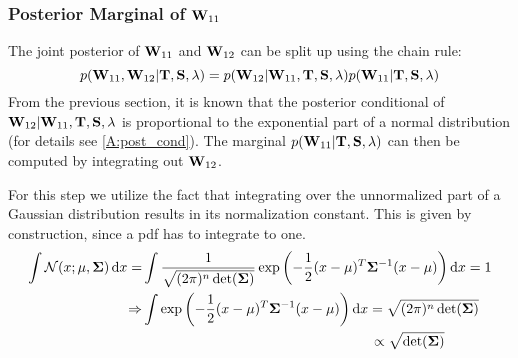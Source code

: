 \subsubsection{Posterior Marginal of $\mathbf{W}_{11}$}
\label{ss:postmarginal}
The joint posterior of $\mathbf{W}_{11}$ and $\mathbf{W}_{12}$ can be split up using the chain rule:
$$ p(\mathbf{W}_{11}, \mathbf{W}_{12} | \mathbf{T}, \mathbf{S}, \lambda) = 
p(\mathbf{W}_{12} | \mathbf{W}_{11}, \mathbf{T}, \mathbf{S}, \lambda) p(\mathbf{W}_{11} | \mathbf{T}, \mathbf{S}, \lambda)
$$
From the previous section, it is known that the posterior conditional of $\mathbf{W}_{12} | \mathbf{W}_{11}, \mathbf{T}, \mathbf{S}, \lambda$
is proportional to the exponential part of a normal distribution (for details see \autoref{A:post_cond}).
The marginal $p(\mathbf{W}_{11} |  \mathbf{T}, \mathbf{S}, \lambda)$ can then be computed by integrating out $\mathbf{W}_{12}$.

For this step we utilize the fact that integrating over the unnormalized part of a Gaussian distribution results in its normalization constant. This is given by construction, since a \gls{pdf} has to integrate to one.
\begin{align*}
\int \mathcal{N}(x;\mu, \matr{\Sigma})\dif x=
&\int \frac{1}{\sqrt{(2\pi)^n\det(\boldsymbol\Sigma)}}
\exp\left(
-\frac{1}{2}({x}-{\mu})^T{\boldsymbol\Sigma}^{-1}({x}-{\mu})
\right)
\dif x
= 1
\\
\Rightarrow
&\int
\exp\left(
-\frac{1}{2}({x}-{\mu})^T{\matr{\Sigma}}^{-1}({x}-{\mu})
\right)
\dif x
= \sqrt{(2\pi)^n\det(\matr{\Sigma})}
\\
&\qquad\qquad\qquad\qquad\qquad\qquad\qquad\quad\quad\ 
\propto \sqrt{\det(\matr{\Sigma})}
\end{align*}

